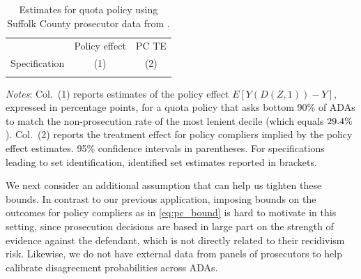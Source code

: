 \documentclass[12pt]{article}%
\theoremstyle{definition}
\newcommand\1{\operatorname{I}\indicatorfence}
\begin{document}
\begin{table}[tp]
  \centering
\begin{threeparttable}
  \caption{Estimates for quota policy using Suffolk County prosecutor data from
  \textcite{adh23}.}\label{tab:quota_suffolk}
  \begin{tabular*}{0.8\linewidth}{@{\extracolsep{\fill}}lcc@{}}
    &Policy effect & {PC TE}\\
    Specification & (1) & (2)\\
    \midrule
    \\[-0.9em]
    \bottomrule
  \end{tabular*}
  \begin{tablenotes}
    \begin{footnotesize}
    \item \emph{Notes}: Col.~(1) reports estimates of the policy effect
      $E[Y(D(Z,1))-Y]$, expressed in percentage points, for a quota policy that
      asks bottom 90\% of ADAs to match the non-prosecution rate of the most
      lenient decile (which equals $29.4\%$). Col.~(2) reports the
      treatment effect for policy compliers implied by the policy effect
      estimates. 95\% confidence intervals in parentheses. For specifications
      leading to set identification, identified set estimates reported in
      brackets.
  \end{footnotesize}
\end{tablenotes}
\end{threeparttable}
\end{table}

We next consider an additional assumption that can help us tighten these bounds. In contrast to our previous application, imposing bounds on the outcomes for policy compliers as in
\cref{eq:pc_bound} is hard to motivate in this setting, since prosecution decisions are based in large part on the strength of evidence
against the defendant, which is not directly related to their recidivism risk.
Likewise, we do not have external data from panels of prosecutors to help calibrate disagreement probabilities across ADAs.
\end{document}
